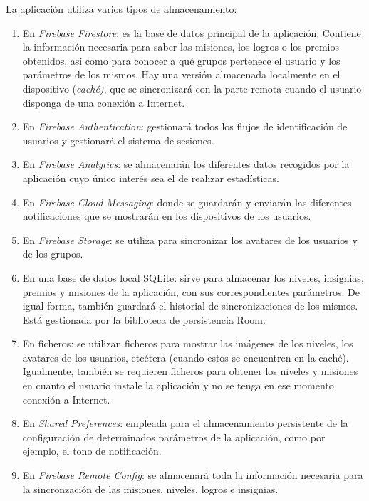 \documentclass[twoside]{report}
\begin{document}
La aplicación utiliza varios tipos de almacenamiento:
\begin{enumerate}
\item En \textit{Firebase Firestore}: es la base de datos principal de la aplicación. Contiene la información necesaria para saber las misiones, los logros o los premios obtenidos, así como para conocer a qué grupos pertenece el usuario y los parámetros de los mismos. Hay una versión almacenada localmente en el dispositivo (\textit{caché)}, que se sincronizará con la parte remota cuando el usuario disponga de una conexión a Internet.

\item En \textit{Firebase Authentication}: gestionará todos los flujos de identificación de usuarios y gestionará el sistema de sesiones.

\item En \textit{Firebase Analytics}: se almacenarán los diferentes datos recogidos por la aplicación cuyo único interés sea el de realizar estadísticas.

\item En \textit{Firebase Cloud Messaging}: donde se guardarán y enviarán las diferentes notificaciones que se mostrarán en los dispositivos de los usuarios.

\item En \textit{Firebase Storage}: se utiliza para sincronizar los avatares de los usuarios y de los grupos.

\item En una base de datos local SQLite: sirve para almacenar los niveles, insignias, premios y misiones de la aplicación, con sus correspondientes parámetros. De igual forma, también guardará el historial de sincronizaciones de los mismos. Está gestionada por \cite{roompersistence} la biblioteca de persistencia Room.

\item En ficheros: se utilizan ficheros para mostrar las imágenes de los niveles, los avatares de los usuarios, etcétera (cuando estos se encuentren en la caché). Igualmente, también se requieren ficheros para obtener los niveles y misiones en cuanto el usuario instale la aplicación y no se tenga en ese momento conexión a Internet.

\item En \textit{Shared Preferences}: empleada para el almacenamiento persistente de la configuración de determinados parámetros de la aplicación, como por ejemplo, el tono de notificación.

\item En \textit{Firebase Remote Config}: se almacenará toda la información necesaria para la sincronzación de las misiones, niveles, logros e insignias. 
\end{enumerate}
\end{document}
